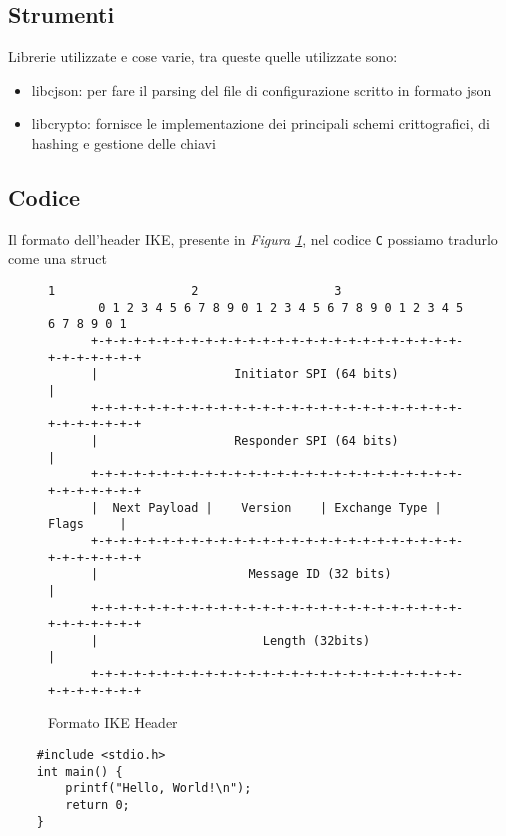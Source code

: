 \subsection{Strumenti}

Librerie utilizzate e cose varie, tra queste quelle utilizzate sono:

\begin{itemize}
    \item libcjson: per fare il parsing del file di configurazione scritto in formato json
    \item libcrypto: fornisce le implementazione dei principali schemi crittografici, di hashing e gestione delle chiavi
\end{itemize}

\subsection{Codice}

Il formato dell'header IKE, presente in \textit{Figura \ref{fig:ike-header}}, nel codice \texttt{C}
possiamo tradurlo come una struct


\begin{figure}
    \footnotesize
    \centering
    \begin{Verbatim}[] 
                           1                   2                   3
       0 1 2 3 4 5 6 7 8 9 0 1 2 3 4 5 6 7 8 9 0 1 2 3 4 5 6 7 8 9 0 1 
      +-+-+-+-+-+-+-+-+-+-+-+-+-+-+-+-+-+-+-+-+-+-+-+-+-+-+-+-+-+-+-+-+ 
      |                   Initiator SPI (64 bits)                     |
      +-+-+-+-+-+-+-+-+-+-+-+-+-+-+-+-+-+-+-+-+-+-+-+-+-+-+-+-+-+-+-+-+ 
      |                   Responder SPI (64 bits)                     |
      +-+-+-+-+-+-+-+-+-+-+-+-+-+-+-+-+-+-+-+-+-+-+-+-+-+-+-+-+-+-+-+-+ 
      |  Next Payload |    Version    | Exchange Type |     Flags     |                              
      +-+-+-+-+-+-+-+-+-+-+-+-+-+-+-+-+-+-+-+-+-+-+-+-+-+-+-+-+-+-+-+-+ 
      |                     Message ID (32 bits)                      |
      +-+-+-+-+-+-+-+-+-+-+-+-+-+-+-+-+-+-+-+-+-+-+-+-+-+-+-+-+-+-+-+-+ 
      |                       Length (32bits)                         | 
      +-+-+-+-+-+-+-+-+-+-+-+-+-+-+-+-+-+-+-+-+-+-+-+-+-+-+-+-+-+-+-+-+ 
    \end{Verbatim}
    \caption{Formato IKE Header}
    \label{fig:ike-header}
\end{figure}

\begin{lstlisting} 
    #include <stdio.h> 
    int main() { 
        printf("Hello, World!\n"); 
        return 0; 
    }
\end{lstlisting}
    


